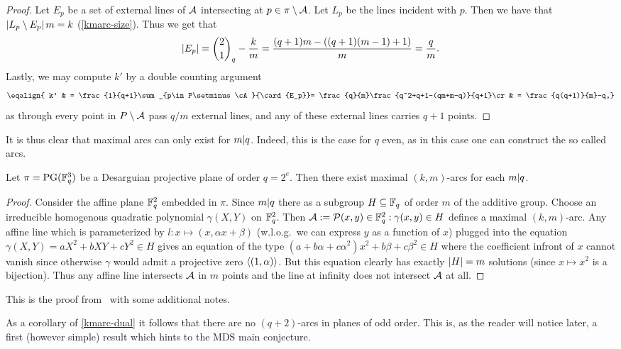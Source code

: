 \begin{proof}
    Let $E_p$ be a set of external lines of $\mathcal{A}$ intersecting at $p\in\pi\setminus\mathcal{A}$. Let $L_p$ be the lines incident with $p$.
    Then we have that $\left|L_p\setminus E_p\right|m=k$ (\autoref{kmarc-size}).
    Thus we get that
    $$
    \card{E_p}=\binom[q]{2}{1}-\frac{k}{m}=\frac{(q+1)m-((q+1)(m-1)+1)}{m}=\frac{q}{m}.
    $$
    Lastly, we may compute $k'$ by a double counting argument
    $$
    \eqalign{
        k'
        & = \frac{1}{q+1}\sum_{p\in P\setminus\cA}{\card{E_p}}= \frac{q}{m}\frac{q^2+q+1-(qm+m-q)}{q+1}\cr
        & = \frac{q(q+1)}{m}-q,}
    $$
    as through every point in $P\setminus\mathcal{A}$ pass $q/m$ external lines, and any of these external lines carries $q+1$ points.
\end{proof}

It is thus clear that maximal arcs can only exist for $m| q$. Indeed, this is the case for $q$ even, as in this case one can construct the so called  arcs.

\begin{lemma}
    Let $\pi=\mathrm{PG}(\mathbb{F}_{q}^3)$ be a Desarguian projective plane of order $q=2^e$. Then there exist maximal $(k,m)$-arcs for each $m| q$. 
\end{lemma}

\begin{proof}
    Consider the affine plane $\mathbb{F}_{q}^2$ embedded in $\pi$. Since $m| q$ there as a subgroup $H\subseteq\mathbb{F}_{q}$ of order $m$ of the additive group. Choose an irreducible homogenous quadratic polynomial $\gamma(X,Y)$ on $\mathbb{F}_{q}^2$. Then $\cA:=\set{(x,y)\in\field{q}^2:\gamma(x,y)\in H}$ defines a maximal $(k,m)$-arc.
    Any affine line which is parameterized by $l:x\mapsto(x,\alpha x+\beta)$ (w.l.o.g.~we can express $y$ as a function of $x$) plugged into the equation $\gamma(X,Y)=aX^2+bXY+cY^2\in H$ gives an equation of the type $(a+b\alpha+c\alpha^2)x^2+b\beta+c\beta^2\in H$ where the coefficient infront of $x$ cannot vanish since otherwise $\gamma$ would admit a projective zero $\gen{(1,\alpha)}$. But this equation clearly has exactly $\left|H\right|=m$ solutions (since $x\mapsto x^2$ is a bijection). Thus any affine line intersects $\mathcal{A}$ in $m$ points and the line at infinity does not intersect $\mathcal{A}$ at all.
\end{proof}

This is the proof from~\cite[p. 120]{handbookincgeokmarcs} with some additional notes.

As a corollary of \autoref{kmarc-dual} it follows that there are no $(q+2)$-arcs in planes of odd order. This is, as the reader will notice later, a first (however simple) result which hints to the MDS main conjecture.


